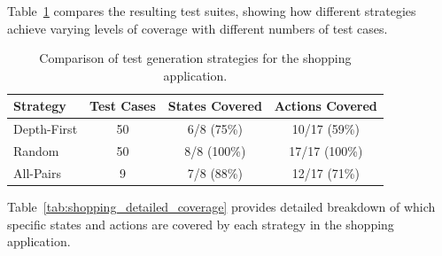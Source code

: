 Table~\ref{tab:shopping_coverage_summary} compares the resulting test suites,
showing how different strategies achieve varying levels of coverage with
different numbers of test cases.

\begin{table}[ht]
\centering
\caption{Comparison of test generation strategies for the shopping application.}
\label{tab:shopping_coverage_summary}
\begin{tabular}{|l|c|c|c|}
\hline
\textbf{Strategy} & \textbf{Test Cases} & \textbf{States Covered} & \textbf{Actions Covered} \\
\hline
Depth-First & 50 & 6/8 (75\%) & 10/17 (59\%) \\
\hline
Random & 50 & 8/8 (100\%) & 17/17 (100\%) \\
\hline
All-Pairs & 9 & 7/8 (88\%) & 12/17 (71\%) \\
\hline
\end{tabular}
\end{table}

Table~\ref{tab:shopping_detailed_coverage} provides detailed breakdown of which
specific states and actions are covered by each strategy in the shopping
application.

